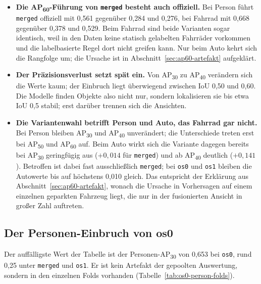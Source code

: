 \begin{itemize}
    \item \textbf{Die AP\textsubscript{60}-Führung von \texttt{merged} besteht auch offiziell.} Bei Person führt \texttt{merged} offiziell mit 0{,}561 gegenüber 0{,}284 und 0{,}276, bei Fahrrad mit 0{,}668 gegenüber 0{,}378 und 0{,}529. Beim Fahrrad sind beide Varianten sogar identisch, weil in den Daten keine statisch gelabelten Fahrräder vorkommen und die labelbasierte Regel dort nicht greifen kann. Nur beim Auto kehrt sich die Rangfolge um; die Ursache ist in Abschnitt~\ref{sec:ap60-artefakt} aufgeklärt.
    \item \textbf{Der Präzisionsverlust setzt spät ein.} Von AP\textsubscript{30} zu AP\textsubscript{40} verändern sich die Werte kaum; der Einbruch liegt überwiegend zwischen IoU 0{,}50 und 0{,}60. Die Modelle finden Objekte also nicht nur, sondern lokalisieren sie bis etwa IoU 0{,}5 stabil; erst darüber trennen sich die Ansichten.
    \item \textbf{Die Variantenwahl betrifft Person und Auto, das Fahrrad gar nicht.} Bei Person bleiben AP\textsubscript{30} und AP\textsubscript{40} unverändert; die Unterschiede treten erst bei AP\textsubscript{50} und AP\textsubscript{60} auf. Beim Auto wirkt sich die Variante dagegen bereits bei AP\textsubscript{30} geringfügig aus (\(+0{,}014\) für \texttt{merged}) und ab AP\textsubscript{40} deutlich (\(+0{,}141\)). Betroffen ist dabei fast ausschließlich \texttt{merged}; bei \texttt{os0} und \texttt{os1} bleiben die Autowerte bis auf höchstens 0{,}010 gleich. Das entspricht der Erklärung aus Abschnitt~\ref{sec:ap60-artefakt}, wonach die Ursache in Vorhersagen auf einem einzelnen geparkten Fahrzeug liegt, die nur in der fusionierten Ansicht in großer Zahl auftreten.
\end{itemize}

\subsection{Der Personen-Einbruch von os0}
\label{sec:os0-person}

Der auffälligste Wert der Tabelle ist der Personen-AP\textsubscript{30} von 0{,}653 bei \texttt{os0}, rund 0{,}25 unter \texttt{merged} und \texttt{os1}. Er ist kein Artefakt der gepoolten Auswertung, sondern in den einzelnen Folds vorhanden (Tabelle~\ref{tab:os0-person-folds}).

